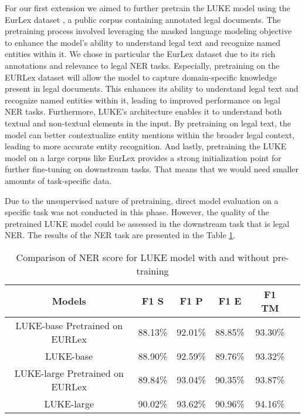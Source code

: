 \documentclass{article}
\begin{document}
For our first extension we aimed to further pretrain the LUKE model using the EurLex dataset \cite{eurlex}, a public corpus containing annotated legal documents. The pretraining process involved leveraging the masked language modeling objective to enhance the model's ability to understand legal text and recognize named entities within it. We chose in particular the EurLex dataset due to its rich annotations and relevance to legal NER tasks. Especially, pretraining on the EURLex dataset will allow the model to capture domain-specific knowledge present in legal documents. This enhances its ability to understand legal text and recognize named entities within it, leading to improved performance on legal NER tasks. Furthermore, 
LUKE's architecture enables it to understand both textual and non-textual elements in the input. By pretraining on legal text, the model can better contextualize entity mentions within the broader legal context, leading to more accurate entity recognition. And lastly, pretraining the LUKE model on a large corpus like EurLex provides a strong initialization point for further fine-tuning on downstream tasks. That means that we would need smaller amounts of task-specific data.

Due to the unsupervised nature of pretraining, direct model evaluation on a specific task was not conducted in this phase. However, the quality of the pretrained LUKE model could be assessed in the downstream task that is legal NER. The results of the NER task are presented in the Table \ref{tab:luke_res}.


\begin{table}[h]
    \centering
    \begin{tabular}{|c|c|c|c|c|c}
        \hline
        Models & F1 S & F1 P & F1 E & F1 TM  \\
        \hline
        LUKE-base Pretrained on EURLex & 88.13\% &92.01\% & 88.85\% & 93.30\% \\
        \hline
        LUKE-base & 88.90\%&	92.59\%&	89.76\% & 93.32\%\\
        \hline
        LUKE-large Pretrained on EURLex & 89.84\% &93.04\% & 90.35\% & 93.87\% \\
        \hline
        LUKE-large  & 90.02\% &93.62\% & 90.96\% & 94.16\% \\
        \hline
        
    \end{tabular}
    \caption{Comparison of NER score for LUKE model with and without pre-training}
    \label{tab:luke_res}
\end{table}
\end{document}
